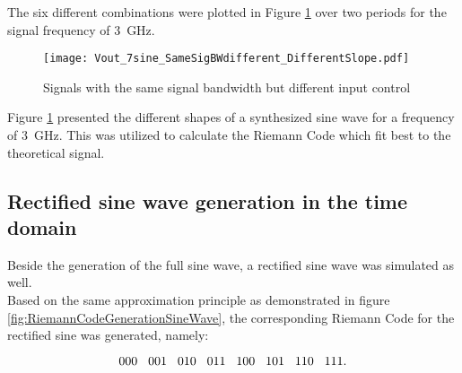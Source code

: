 The six different combinations were plotted in Figure \ref{fig:SameSigBWDifSlope} over two periods for the signal frequency of \SI{3}{\GHz}. 

\begin{figure}[htb!]
	\centering
  \texttt{[image: Vout\_7sine\_SameSigBWdifferent\_DifferentSlope.pdf]}
	\caption{Signals with the same signal bandwidth but different input control}
	\label{fig:SameSigBWDifSlope}
\end{figure}

Figure \ref{fig:SameSigBWDifSlope} presented the different shapes of a synthesized sine wave for a frequency of \SI{3}{\GHz}.
This was utilized to calculate the Riemann Code which fit best to the theoretical signal.


\subsection{Rectified sine wave generation in the time domain}
Beside the generation of the full sine wave, a rectified sine wave was simulated as well.\\
Based on the same approximation principle as demonstrated in figure \ref{fig:RiemannCodeGenerationSineWave}, the corresponding Riemann Code for the rectified sine was generated, namely:



\begin{equation}
 000\hspace{.3cm} 001\hspace{.3cm} 010\hspace{.3cm} 011\hspace{.3cm} 100\hspace{.3cm} 101\hspace{.3cm} 110\hspace{.3cm} 111.
\end{equation}
\label{eq:RiemannCodeRectSine}

